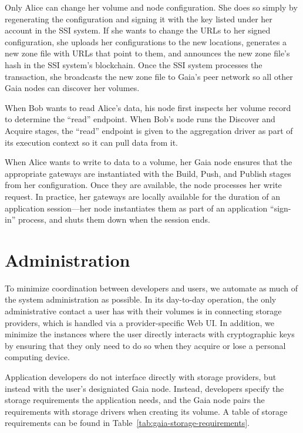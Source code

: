 Only Alice can change her volume and node configuration.  She does so simply by
regenerating the configuration and signing it with the key listed under her
account in the SSI system.  If she wants to change the URLs to her signed
configuration, she uploads her configurations to the new locations, generates a
new zone file with URLs that point to them, and announces the new zone file's
hash in the SSI system's blockchain.  Once the SSI system processes the
transaction, she broadcasts the new zone file to Gaia's peer network so all
other Gaia nodes can discover her volumes.

When Bob wants to read Alice's data, his node first inspects her volume record
to determine the ``read'' endpoint.  When Bob's node runs the Discover and
Acquire stages, the ``read'' endpoint is given to the aggregation driver as part
of its execution context so it can pull data from it.

When Alice wants to write to data to a volume, her Gaia node ensures that the
appropriate gateways are instantiated with the Build, Push, and Publish stages
from her configuration.  Once they are available, the node processes her write
request.  In practice, her gateways are locally available for the duration of an
application session---her node instantiates them as part of an application
``sign-in'' process, and shuts them down when the session ends.

\section{Administration}

To minimize coordination between developers and users, we
automate as much of the system administration as possible.
In its day-to-day operation, the only administrative contact a user has with their volumes is
in connecting storage providers, which is handled via a provider-specific Web
UI.  In addition, we minimize the instances where the user directly interacts with cryptographic keys
by ensuring that they only need to do so when they acquire or lose a personal
computing device.

Application developers do not interface directly with storage providers, but
instead with the user's designiated Gaia node.
Instead, developers specify the storage requirements the
application needs, and the Gaia node pairs the requirements with storage drivers
when creating its volume.  A table of storage requirements can be found in
Table~\ref{tab:gaia-storage-requirements}.

